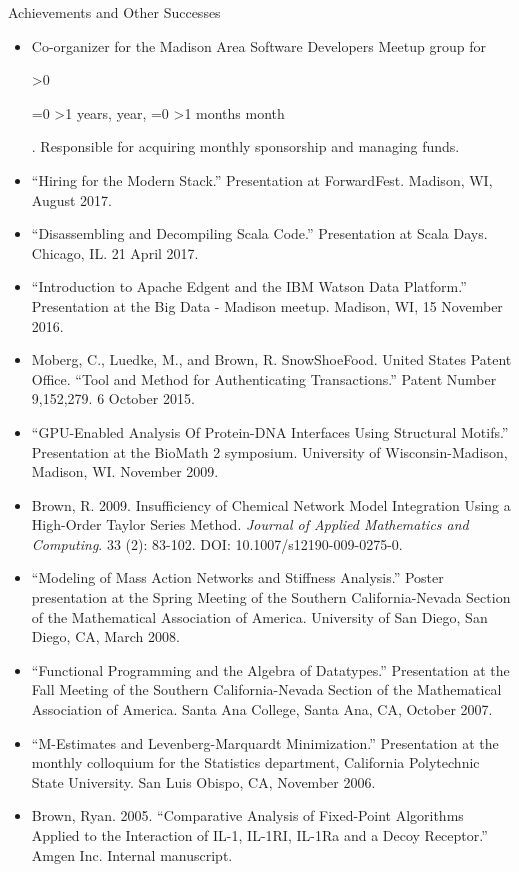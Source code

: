 \documentclass[11pt,oneside]{article}
\newenvironment{ressection}[1]{
	\vspace{4pt}
	{\fontfamily{phv}\selectfont\Large#1}
	\begin{itemize}[label={--}]
	\vspace{3pt}
}{
	\end{itemize}
}
\newcommand{\resitem}[1]{
	\vspace{-4pt}
	\item \begin{flushleft} #1 \end{flushleft}
}
\newcounter{datetoday}
\newcounter{diffyears}
\newcounter{diffmonths}
\newcounter{diffdays}
\newcommand{\difftoday}[3]{%
      \setmydatenumber{datetoday}{\the\year}{\the\month}{\the\day}%
      \setmydatenumber{diffdays}{#1}{#2}{#3}%
      \addtocounter{diffdays}{-\thedatetoday}%
      \ifnum\value{diffdays}>0
        \def\diffbefore{in }%
        \def\diffafter{}%
      \else
        \def\diffbefore{}%
        \def\diffafter{}%
        \setcounter{diffdays}{-\value{diffdays}}%
      \fi
      \setcounter{diffyears}{\value{diffdays}/365}%
      \setcounter{diffdays}{\value{diffdays}-365*\value{diffyears}}%
      \setcounter{diffmonths}{\value{diffdays}/30}%
      \setcounter{diffdays}{\value{diffdays}-30*\value{diffmonths}}%
      \diffbefore
      \ifnum\value{diffyears}=0
      \else
        \ifnum\value{diffyears}>1
            \thediffyears\space years,
        \else
            \thediffyears\space year,
        \fi
      \fi
      \ifnum\value{diffmonths}=0
      \else
        \ifnum\value{diffmonths}>1
            \thediffmonths\space months
        \else
            \thediffmonths\space month
        \fi
      \fi
      \diffafter
}
\begin{document}
\begin{ressection}{Achievements and Other Successes}
\resitem{Co-organizer for the Madison Area Software Developers Meetup group for  \difftoday{2012}{11}{10}. Responsible for acquiring monthly sponsorship and managing funds.}

\resitem{``Hiring for the Modern Stack.'' Presentation at ForwardFest. Madison, WI, August 2017.}

\resitem{``Disassembling and Decompiling Scala Code.'' Presentation at Scala Days. Chicago, IL. 21 April 2017.}

\resitem{``Introduction to Apache Edgent and the IBM Watson Data Platform.'' Presentation at the Big Data - Madison meetup. Madison, WI, 15 November 2016.}
	

\resitem{Moberg, C., Luedke, M., and Brown, R. SnowShoeFood. United States Patent Office. ``Tool and Method for Authenticating Transactions.'' Patent Number 9,152,279. 6 October 2015.}



\resitem{``GPU-Enabled Analysis Of Protein-DNA Interfaces Using Structural Motifs.'' Presentation at the BioMath 2 symposium. University of Wisconsin-Madison, Madison, WI. November 2009.}

\resitem{Brown, R. 2009.  Insufficiency of Chemical Network Model Integration Using a High-Order Taylor Series Method. \emph{Journal of Applied Mathematics and Computing}. 33 (2): 83-102. DOI: 10.1007/s12190-009-0275-0.}

\resitem{``Modeling of Mass Action Networks and Stiffness Analysis.'' Poster presentation at the Spring Meeting of the Southern California-Nevada Section of the Mathematical Association of America. University of San Diego, San Diego, CA, March 2008.}
	
\resitem{``Functional Programming and the Algebra of Datatypes.'' Presentation at the Fall Meeting of the Southern California-Nevada Section of the Mathematical Association of America. Santa Ana College, Santa Ana, CA, October 2007.}
	
\resitem{``M-Estimates and Levenberg-Marquardt Minimization.'' Presentation at the monthly colloquium for the Statistics department, California Polytechnic State University. San Luis Obispo, CA, November 2006.}
	
\resitem{Brown, Ryan. 2005. ``Comparative Analysis of Fixed-Point Algorithms Applied to the Interaction of IL-1, IL-1RI, IL-1Ra and a Decoy Receptor.'' Amgen Inc. Internal manuscript.}
\end{ressection}
\end{document}
